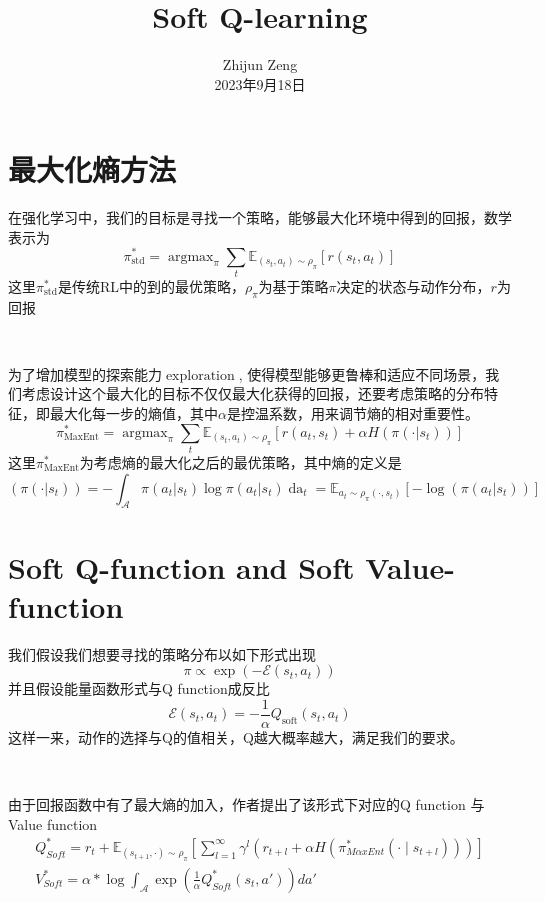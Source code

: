 \documentclass{article}
\newcommand{\nobracket}{}
\newcommand{\tmaffiliation}[1]{\\ #1}
\newcommand{\tmop}[1]{\ensuremath{\operatorname{#1}}}
\begin{document}
\begin{CJK*}{UTF8}{gbsn}

\title{Soft Q-learning}

\author{
  Zhijun Zeng
  \tmaffiliation{2023年9月18日}
}

\maketitle

\section{最大化熵方法}

在强化学习中，我们的目标是寻找一个策略，能够最大化环境中得到的回报，数学表示为
\[ \pi^{\ast}_{\tmop{std}} = \tmop{argmax}_{\pi} \sum_t \mathbb{E}_{(s_t, a_t)
   \sim \rho_{\pi}} [r (s_t, a_t)] \]
这里$\pi_{\tmop{std}}^{\ast}$是传统RL中的到的最优策略，$\rho_{\pi}$为基于策略$\pi$决定的状态与动作分布，$r$为回报

\

为了增加模型的探索能力$\tmop{exploration}$,
使得模型能够更鲁棒和适应不同场景，我们考虑设计这个最大化的目标不仅仅最大化获得的回报，还要考虑策略的分布特征，即最大化每一步的熵值，其中$\alpha$是控温系数，用来调节熵的相对重要性。
\[ \pi^{\ast}_{\tmop{MaxEnt}} = \tmop{argmax}_{\pi} \sum_t \mathbb{E}_{(s_t,
   a_t) \sim \rho_{\pi}} [r (a_t, s_t) + \alpha H (\pi (\cdot | \nobracket
   s_t))] \]
这里$\pi_{\tmop{MaxEnt}}^{\ast}$为考虑熵的最大化之后的最优策略，其中熵的定义是
\[ (\pi (\cdot | \nobracket s_t)) = - \int_{\mathcal{A}} \pi (a_t | \nobracket
   s_t) \log \pi (a_t | \nobracket s_t) \tmop{da}_t =\mathbb{E}_{a_t \sim
   \rho_{\pi} (\cdot , s_t)} [- \log (\pi (a_t | \nobracket s_t))] \]

\section{Soft Q-function and Soft Value-function}

我们假设我们想要寻找的策略分布以如下形式出现
\[ \pi \propto \exp (-\mathcal{E} (s_t, a_t)) \]
并且假设能量函数形式与Q function成反比
\[ \mathcal{E} (s_t, a_t) = - \frac{1}{\alpha} Q_{\tmop{soft}} (s_t, a_t) \]
这样一来，动作的选择与Q的值相关，Q越大概率越大，满足我们的要求。

\

由于回报函数中有了最大熵的加入，作者提出了该形式下对应的Q
function 与 Value function
\[ \begin{array}{l}
     Q_{Soft}^{\ast} = r_t +\mathbb{E}_{(s_{t + 1}, \cdot) \sim \rho_{\pi}}
     \left[ \sum_{l = 1}^{\infty} \gamma^l  (r_{t + l} + \alpha H (\pi_{M
     \alpha xEnt}^{\ast}  (\cdot \mid s_{t + l}))) \right]\\
     V_{Soft}^{\ast} = \alpha \ast \log \int_{\mathcal{A}} \exp \left(
     \frac{1}{\alpha} Q_{Soft}^{\ast} (s_t, a') \right) da'
   \end{array} \]



\end{CJK*}
\end{document}
